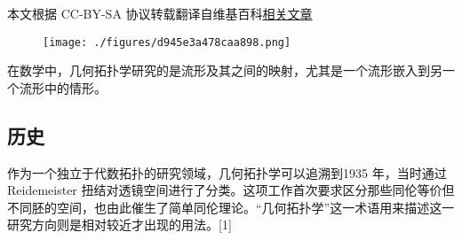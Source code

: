 
本文根据 CC-BY-SA 协议转载翻译自维基百科\href{https://en.wikipedia.org/wiki/Geometric_topology}{相关文章}

\begin{figure}[ht]
\centering
\texttt{[image: ./figures/d945e3a478caa898.png]}
\caption{} \label{fig_JHtpx_1}
\end{figure}
在数学中，几何拓扑学研究的是流形及其之间的映射，尤其是一个流形嵌入到另一个流形中的情形。
\subsection{历史}
作为一个独立于代数拓扑的研究领域，几何拓扑学可以追溯到1935 年，当时通过Reidemeister 扭结对透镜空间进行了分类。这项工作首次要求区分那些同伦等价但不同胚的空间，也由此催生了简单同伦理论。“几何拓扑学”这一术语用来描述这一研究方向则是相对较近才出现的用法。[1]
